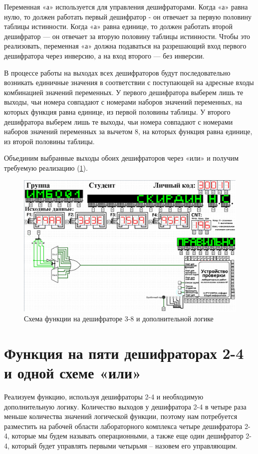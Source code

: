\documentclass[14pt, a4paper]{extreport}
\begin{document}
Переменная «а» используется для управления дешифраторами. Когда «а» равна нулю, то должен работать первый дешифратор - он отвечает за первую половину таблицы истинности. Когда «а» равна единице, то должен работать второй дешифратор — он отвечает за вторую половину таблицы истинности. Чтобы это реализовать, переменная «а» должна подаваться на разрешающий вход первого дешифратора через инверсию, а на вход второго — без инверсии.

В процессе работы на выходах всех дешифраторов будут последовательно возникать единичные значения в соответствии с поступающей на адресные входы комбинацией значений переменных. У первого дешифратора выберем лишь те выходы, чьи номера совпадают с номерами наборов значений переменных, на которых функция равна единице, из первой половины таблицы. У второго дешифратора выберем лишь те выходы, чьи номера совпадают с номерами наборов значений переменных за вычетом 8, на которых функция равна единице, из второй половины таблицы.

Объединим выбранные выходы обоих дешифраторов через «или» и получим требуемую реализацию (\cref{fig:decoder-3-8}).
\begin{figure}[H]
	\caption{Схема функции на дешифраторе 3-8 и дополнительной логике}
	\label{fig:decoder-3-8}
	\includegraphics[width=\textwidth]{decoder-3-8}
\end{figure}

\section{Функция на пяти дешифраторах 2-4 и одной схеме «или»}
Реализуем функцию, используя дешифраторы 2-4 и необходимую дополнительную логику. Количество выходов у дешифратора 2-4 в четыре раза меньше количества значений логической функции, поэтому нам потребуется разместить на рабочей области лабораторного комплекса четыре дешифратора 2-4, которые мы будем называть операционными, а также еще один дешифратор 2-4, который будет управлять первыми четырьмя – назовем его управляющим.
\end{document}
